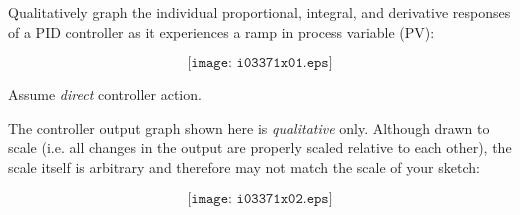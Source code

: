 

Qualitatively graph the individual proportional, integral, and derivative responses of a PID controller as it experiences a ramp in process variable (PV):

$$\texttt{[image: i03371x01.eps]}$$

Assume {\it direct} controller action.







The controller output graph shown here is {\it qualitative} only.  Although drawn to scale (i.e. all changes in the output are properly scaled relative to each other), the scale itself is arbitrary and therefore may not match the scale of your sketch:
 
$$\texttt{[image: i03371x02.eps]}$$











